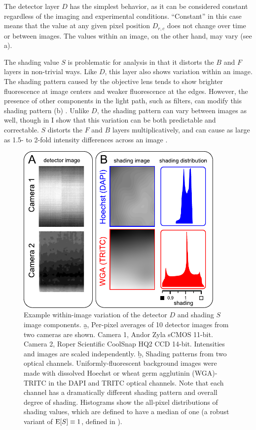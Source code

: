 The detector layer $D$ has the simplest behavior, as it can be considered
constant regardless of the imaging and experimental conditions. ``Constant'' in this
case means that the value at any given pixel position $D_{r,c}$ does not change
over time or between images.
The values within an image, on the other hand, may vary
(see a).


The shading value $S$ is problematic for analysis in that it distorts the
$B$ and $F$ layers in non-trivial ways.
Like $D$, this layer also shows variation within an image.
The shading pattern caused by the objective lens
tends to show brighter fluorescence at image centers
and weaker fluorescence at the edges. However,
the presence of other components
in the light path, such as filters, can modify this shading pattern
(b) \cite{VandenDoel1998}.
Unlike $D$, the shading pattern can vary between
images as well, though in  I show that this variation
can be both predictable and correctable. $S$ distorts the $F$ and $B$ layers
multiplicatively, and can cause as
large as 1.5- to 2-fold intensity differences across an image
\cite{Bray2013}.




  \begin{figure}[!bt]
  \centering
  \includegraphics[width=4in]{FIGS/imaging/properties.pdf}
  {\singlespacing 
  \caption[ Example detector $D$ and shading $S$ patterns.]
            { Example within-image variation of the detector $D$
			and shading $S$ image components. \b{a}, Per-pixel
            averages of 10 detector images from
			two cameras are shown. Camera 1, Andor Zyla sCMOS 11-bit.
			Camera 2, Roper Scientific CoolSnap HQ2 CCD 14-bit.
            Intensities and
			images are scaled independently.
			\b{b}, Shading patterns from two optical channels. Uniformly-fluorescent
			background images were made with dissolved Hoechst or wheat
			germ agglutinin (WGA)-TRITC in the DAPI and TRITC optical channels. Note
			that each channel has a dramatically different shading pattern and overall
			degree of shading. Histograms show the all-pixel distributions
			of shading values, which are defined to have
			a median of one (a robust variant of $\mathrm{E}[S]\equiv 1$, defined in
			).
			}
  \label{fig:imaging:properties}}
  \end{figure}


